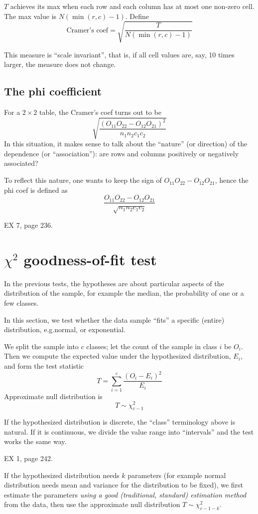 \documentclass[12pt]{article}
\begin{document}
$T$ achieves its max when each row and each column has at most one
non-zero cell. The max value is
$N(\min(r,c) - 1)$.
Define
\[
\text{Cramer's coef}
= \sqrt{\frac{T}{N(\min(r,c) - 1)}}
\]

This measure is ``scale invariant'', that is,
if all cell values are, say, 10 times larger,
the measure does not change.

\subsection{The phi coefficient}

For a $2\times 2$ table, the Cramer's coef turns out to be
\[
\sqrt{\frac{(O_{11}O_{22} - O_{12}O_{21})^2}{n_1n_2c_1c_2}}
\]
In this situation, it makes sense to talk about the ``nature'' (or
direction) of the dependence (or ``association''): are rows and columns
positively or negatively associated?

To reflect this nature, one wants to keep the sign of
$O_{11}O_{22} - O_{12}O_{21}$, hence the phi coef is defined as
\[
\frac{O_{11}O_{22} - O_{12}O_{21}}{\sqrt{n_1n_2c_1c_2}}
\]

\example EX 7, page 236.


\section{$\chi^2$ goodness-of-fit test}

In the previous tests, the hypotheses are about
particular aspects of the distribution of the sample, for example
the median, the probability of one or a few classes.

In this section, we test whether the data sample ``fits''
a specific (entire) distribution, e.g.\@ normal, or exponential.

We split the sample into $c$ classes;
let the count of the sample in class $i$ be $O_i$.
Then we compute the expected value under the hypothesized distribution,
$E_i$, and form the test statistic
\[
T = \sum_{i=1}^c \frac{(O_i - E_i)^2}{E_i}
\]
Approximate null distribution is
\[
T \sim \chi^2_{c-1}
\]

If the hypothesized distribution is discrete,
the ``class'' terminology above is natural.
If it is continuous, we divide the value range into
``intervals'' and the test works the same way.

\example EX 1, page 242.

\alert
If the hypothesized distribution needs $k$ parameters
(for example normal distribution needs mean and variance
for the distribution to be fixed), we first estimate the parameters
\emph{using a good (traditional, standard) estimation method}
from the data, then use the approximate null distribution
$T \sim \chi^2_{c-1-k}$.
\end{document}
